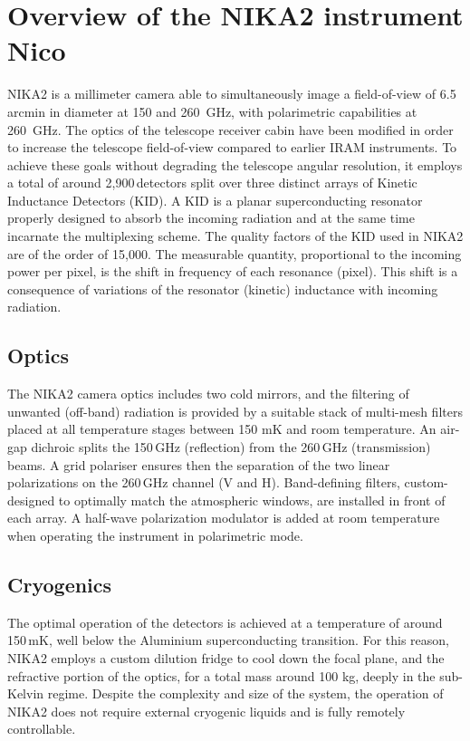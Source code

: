 
\section{Overview of the NIKA2 instrument {\color{blue} Nico} }

NIKA2 is a millimeter camera able to simultaneously image a field-of-view of
6.5\,arcmin in diameter at 150 and 260~GHz, with polarimetric capabilities at
260~GHz. The optics of the telescope receiver cabin have been modified in order
to increase the telescope field-of-view compared to earlier IRAM instruments. To
achieve these goals without degrading the telescope angular resolution, it
employs a total of around 2,900\,detectors split over three distinct arrays of
Kinetic Inductance Detectors (KID). A KID is a planar superconducting resonator
properly designed to absorb the incoming radiation and at the same time
incarnate the multiplexing scheme. The quality factors of the KID used in NIKA2
are of the order of 15,000. The measurable quantity, proportional to the
incoming power per pixel, is the shift in frequency of each resonance
(pixel). This shift is a consequence of variations of the resonator (kinetic)
inductance with incoming radiation.

\subsection{Optics}

The NIKA2 camera optics includes two cold mirrors, and the filtering of unwanted
(off-band) radiation is provided by a suitable stack of multi-mesh filters
placed at all temperature stages between 150 mK and room temperature. An air-gap
dichroic splits the 150\,GHz (reflection) from the 260\,GHz (transmission)
beams. A grid polariser ensures then the separation of the two linear
polarizations on the 260\,GHz channel (V and H). Band-defining filters,
custom-designed to optimally match the atmospheric windows, are installed in
front of each array. A half-wave polarization modulator is added at room
temperature when operating the instrument in polarimetric mode.



\subsection{Cryogenics}

The optimal operation of the detectors is achieved at a temperature of around
150\,mK, well below the Aluminium superconducting transition. For this reason,
NIKA2 employs a custom dilution fridge to cool down the focal plane, and the
refractive portion of the optics, for a total mass around 100 kg, deeply in the
sub-Kelvin regime. Despite the complexity and size of the system, the operation
of NIKA2 does not require external cryogenic liquids and is fully remotely
controllable.

